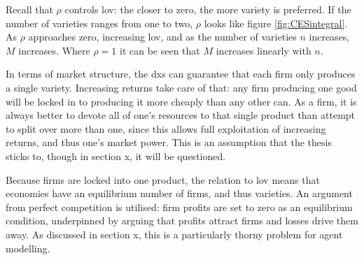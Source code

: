 Recall that $\rho$ controls \gls{lov}: the closer to zero, the more variety is preferred. If the number of varieties ranges from one to two, $\rho$ looks like figure \ref{fig:CESintegral}. As $\rho$ approaches zero, increasing \gls{lov}, and as the number of varieties $n$ increases, $M$ increases. Where $\rho=1$ it can be seen that $M$ increases linearly with $n$. 


In terms of market structure, the \gls{dxs} can guarantee that each firm only produces a single variety. Increasing returns take care of that: any firm producing one good will be locked in to producing it more cheaply than any other can. As a firm, it is always better to devote all of one's resources to that single product than attempt to split over more than one, since this allows full exploitation of increasing returns, and thus one's market power. This is an assumption that the thesis sticks to, though in section x, it will be questioned. 

Because firms are locked into one product, the relation to \gls{lov} means that economies have an equilibrium number of firms, and thus varieties. An argument from perfect competition is utilised: firm profits are set to zero as an equilibrium condition, underpinned by arguing that profits attract firms and losses drive them away. As discussed in section x, this is a particularly thorny problem for agent modelling.

